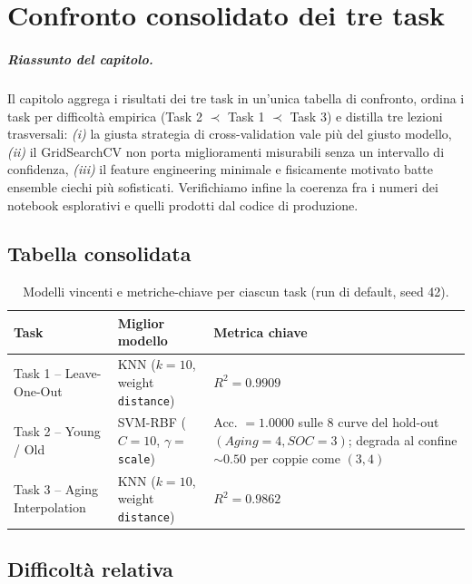 \chapter{Confronto consolidato dei tre task}
\label{chap:results}

\paragraph{Riassunto del capitolo.} Il capitolo aggrega i risultati dei
tre task in un'unica tabella di confronto, ordina i task per difficoltà
empirica (Task 2 $\prec$ Task 1 $\prec$ Task 3) e distilla tre lezioni
trasversali: \emph{(i)} la giusta strategia di cross-validation vale
più del giusto modello, \emph{(ii)} il GridSearchCV non porta
miglioramenti misurabili senza un intervallo di confidenza, \emph{(iii)}
il feature engineering minimale e fisicamente motivato batte ensemble
ciechi più sofisticati. Verifichiamo infine la coerenza fra i numeri
dei notebook esplorativi e quelli prodotti dal codice di produzione.

\section{Tabella consolidata}

\begin{table}[H]
  \centering
  \small
  \caption{Modelli vincenti e metriche-chiave per ciascun task (run di
  default, seed 42).}
  \label{tab:results-overall}
  \begin{tabularx}{\linewidth}{@{}p{2.6cm} p{3.2cm} X@{}}
    \toprule
    \textbf{Task} & \textbf{Miglior modello} & \textbf{Metrica chiave} \\
    \midrule
    Task 1 -- Leave-One-Out & KNN ($k{=}10$, weight \texttt{distance}) & $R^{2} = 0.9909$ \\
    Task 2 -- Young / Old & SVM-RBF ($C{=}10$, $\gamma{=}$\texttt{scale}) & Acc. $= 1.0000$ sulle 8 curve del hold-out $(Aging{=}4, SOC{=}3)$; degrada al confine $\sim 0.50$ per coppie come $(3, 4)$ \\
    Task 3 -- Aging Interpolation & KNN ($k{=}10$, weight \texttt{distance}) & $R^{2} = 0.9862$ \\
    \bottomrule
  \end{tabularx}
\end{table}

\section{Difficoltà relativa}

